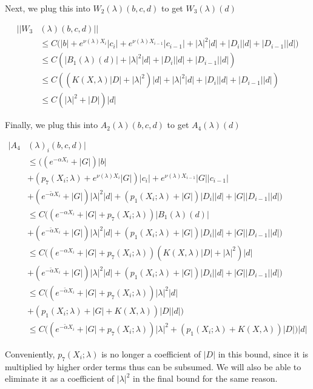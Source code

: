 \documentclass[12pt]{article}
\begin{document}
\begin{enumerate}
Next, we plug this into $W_2(\lambda)(b, c, d)$ to get $W_3(\lambda)(d)$

\begin{align*}
||W_3&(\lambda)(b,c,d)|| \\
&\leq C \Big( |b| + e^{\nu(\lambda)X_i} |c_i| + e^{\nu(\lambda)X_{i-1}} |c_{i-1}| 
+ |\lambda|^2 |d| + |D_i||d| + |D_{i-1}||d|) \\
&\leq C( |B_1(\lambda)(d)|+ |\lambda|^2 |d| + |D_i||d| + |D_{i-1}||d|) \\
&\leq C( ( K(X, \lambda) |D|+ |\lambda|^2 )|d| + |\lambda|^2 |d| + |D_i||d| + |D_{i-1}||d|) \\
&\leq C( |\lambda|^2 + |D|)|d|
\end{align*}

Finally, we plug this into $A_2(\lambda)(b, c, d)$ to get $A_4(\lambda)(d)$

\begin{align*}
|A_4&(\lambda)_i(b, c, d)| \\
&\leq \Big( (e^{-\alpha X_i} + |G| )|b| \\
&+ (p_7(X_i; \lambda) + e^{\nu(\lambda)X_i} |G|) |c_i| + e^{\nu(\lambda)X_{i-1}} |G| |c_{i-1}| \\
&+ (e^{-\tilde{\alpha} X_i} + |G|)|\lambda|^2 |d| 
+ (p_1(X_i; \lambda) + |G|) |D_i| |d| 
+ |G| |D_{i-1}| |d| \Big) \\
&\leq C \Big( (e^{-\alpha X_i} + |G| + p_7(X_i; \lambda))|B_1(\lambda)(d)|\\
&+ (e^{-\tilde{\alpha} X_i} + |G|)|\lambda|^2 |d| 
+ (p_1(X_i; \lambda) + |G|) |D_i| |d| 
+ |G| |D_{i-1}| |d| \Big) \\
&\leq C \Big( (e^{-\alpha X_i} + |G| + p_7(X_i; \lambda))
( K(X, \lambda) |D|+ |\lambda|^2 )|d|\\
&+ (e^{-\tilde{\alpha} X_i} + |G|)|\lambda|^2 |d| 
+ (p_1(X_i; \lambda) + |G|) |D_i| |d| 
+ |G| |D_{i-1}| |d| \Big) \\
&\leq C \Big( (e^{-\tilde{\alpha} X_i} + |G| + p_7(X_i; \lambda))|\lambda|^2 |d| \\ 
&+ (p_1(X_i; \lambda) + |G| + K(X, \lambda) ) |D| |d| \Big) \\
&\leq C \Big( (e^{-\tilde{\alpha} X_i} + |G| + p_7(X_i; \lambda))|\lambda|^2 + (p_1(X_i; \lambda) + K(X, \lambda) ) |D| \Big)|d|
\end{align*}

Conveniently, $p_7(X_i; \lambda)$ is no longer a coefficient of $|D|$ in this bound, since it is multiplied by higher order terms thus can be subsumed. We will also be able to eliminate it as a coefficient of $|\lambda|^2$ in the final bound for the same reason.


\end{enumerate}
\end{document}
